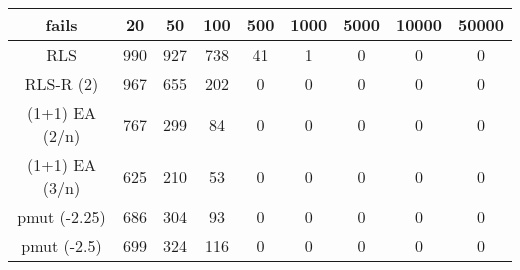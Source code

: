 \begin{tabular}[h]{ccccccccc}
fails&20&50&100&500&1000&5000&10000&50000\\\hline
RLS&990&927&738&41&1&0&0&0\\
RLS-R (2)&967&655&202&0&0&0&0&0\\
(1+1) EA (2/n)&767&299&84&0&0&0&0&0\\
(1+1) EA (3/n)&625&210&53&0&0&0&0&0\\
pmut (-2.25)&686&304&93&0&0&0&0&0\\
pmut (-2.5)&699&324&116&0&0&0&0&0\\
\end{tabular}
